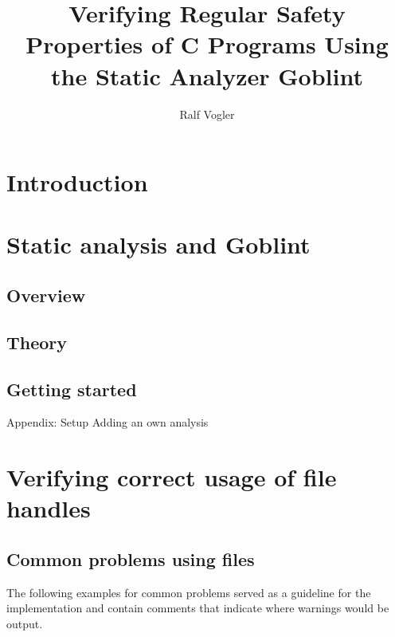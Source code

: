 \documentclass[
fontsize=11pt,paper=a4,
bibliography=totoc, listof=totoc,
headsepline,footsepline,
footinclude=false,BCOR=12mm,DIV=13]{scrbook}
\title{Verifying Regular Safety Properties of C Programs Using the Static Analyzer Goblint}
\author{Ralf Vogler}
\begin{document}
\maketitle
\tableofcontents



\chapter{Introduction}



\chapter{Static analysis and Goblint}
\section{Overview}

\section{Theory}

\section{Getting started}
Appendix: Setup
Adding an own analysis


\chapter{Verifying correct usage of file handles}
\section{Common problems using files}
The following examples for common problems served as a guideline for the implementation and contain comments that indicate where warnings would be output.
\end{document}
